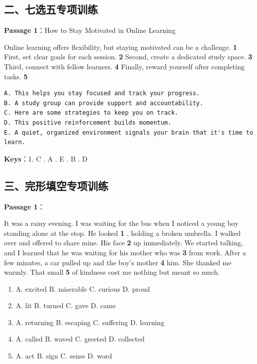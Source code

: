 \subsection{二、七选五专项训练}

\textbf{Passage 1}：How to Stay Motivated in Online Learning

Online learning offers flexibility, but staying motivated can be a challenge. \textbf{1} \underline{\hspace{3cm}} First, set clear goals for each session. \textbf{2} \underline{\hspace{3cm}} Second, create a dedicated study space. \textbf{3} \underline{\hspace{3cm}} Third, connect with fellow learners. \textbf{4} \underline{\hspace{3cm}} Finally, reward yourself after completing tasks. \textbf{5} \underline{\hspace{3cm}}

\begin{verbatim}
A. This helps you stay focused and track your progress.
B. A study group can provide support and accountability.
C. Here are some strategies to keep you on track.
D. This positive reinforcement builds momentum.
E. A quiet, organized environment signals your brain that it's time to learn.
\end{verbatim}

\textbf{Keys}：1. C . A . E . B . D

\subsection{三、完形填空专项训练}

\textbf{Passage 1}：

It was a rainy evening. I was waiting for the bus when I noticed a young boy standing alone at the stop. He looked \textbf{1} , holding a broken umbrella. I walked over and offered to share mine. His face \textbf{2} up immediately. We started talking, and I learned that he was waiting for his mother who was \textbf{3} from work. After a few minutes, a car pulled up and the boy's mother \textbf{4} him. She thanked me warmly. That small \textbf{5} of kindness cost me nothing but meant so much.

\begin{enumerate}
  \item[1.] A. excited \quad B. miserable \quad C. curious \quad D. proud
  \item[2.] A. lit \quad B. turned \quad C. gave \quad D. came
  \item[3.] A. returning \quad B. escaping \quad C. suffering \quad D. learning
  \item[4.] A. called \quad B. waved \quad C. greeted \quad D. collected
  \item[5.] A. act \quad B. sign \quad C. sense \quad D. word
\end{enumerate}

